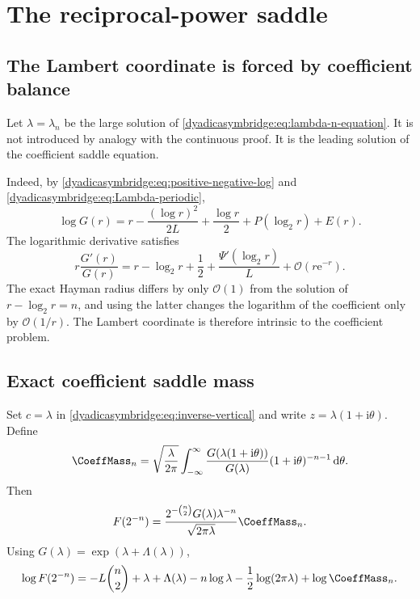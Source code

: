 \documentclass[11pt,oneside]{article}
\theoremstyle{definition}
\theoremstyle{remark}
\newcommand{\e}{\mathrm e}
\newcommand{\ii}{\mathrm i}
\newcommand{\dd}{\,\mathrm d}
\newcommand{\bigO}{\mathcal O}
\begin{document}
\section{The reciprocal-power saddle}
\label{dyadicasymbridge:sec:inverse-saddle}

\subsection{The Lambert coordinate is forced by coefficient balance}

Let $\lambda=\lambda_n$ be the large solution of \eqref{dyadicasymbridge:eq:lambda-n-equation}.  It is not introduced by analogy with the continuous proof.  It is the leading solution of the coefficient saddle equation.

Indeed, by \eqref{dyadicasymbridge:eq:positive-negative-log} and \eqref{dyadicasymbridge:eq:Lambda-periodic},
\begin{equation}
 \log G(r)=
 r-\frac{(\log r)^2}{2L}+\frac{\log r}{2}
 +P(\log_2r)+E(r).
\label{dyadicasymbridge:eq:logG-positive}
\end{equation}
The logarithmic derivative satisfies
\begin{equation}
 r\frac{G'(r)}{G(r)}
 =r-\log_2r+\frac12+\frac{\Psi'(\log_2r)}L+\bigO(r\e^{-r}).
\label{dyadicasymbridge:eq:coefficient-saddle-exactish}
\end{equation}
The exact Hayman radius differs by only $\bigO(1)$ from the solution of
$r-\log_2r=n$, and using the latter changes the logarithm of the coefficient only by
$\bigO(1/r)$.  The Lambert coordinate is therefore intrinsic to the coefficient problem.

\subsection{Exact coefficient saddle mass}

Set $c=\lambda$ in \eqref{dyadicasymbridge:eq:inverse-vertical} and write
$z=\lambda(1+\ii\theta)$.  Define
\begin{equation}
 \CoeffMass_n=
 \sqrt{\frac{\lambda}{2\pi}}
 \int_{-\infty}^{\infty}
 \frac{G(\lambda(1+\ii\theta))}{G(\lambda)}
 (1+\ii\theta)^{-n-1}\dd\theta.
\label{dyadicasymbridge:eq:Cn-def}
\end{equation}
Then
\begin{equation}
 F(2^{-n})=
 \frac{2^{-\binom n2}G(\lambda)\lambda^{-n}}
 {\sqrt{2\pi\lambda}}\CoeffMass_n.
\label{dyadicasymbridge:eq:exact-coefficient-saddle}
\end{equation}
Using $G(\lambda)=\exp(\lambda+\Lambda(\lambda))$,
\begin{equation}
 \log F(2^{-n})=
 -L\binom n2+\lambda+\Lambda(\lambda)-n\log\lambda
 -\frac12\log(2\pi\lambda)+\log\CoeffMass_n.
\label{dyadicasymbridge:eq:exact-log-coefficient}
\end{equation}
\end{document}
